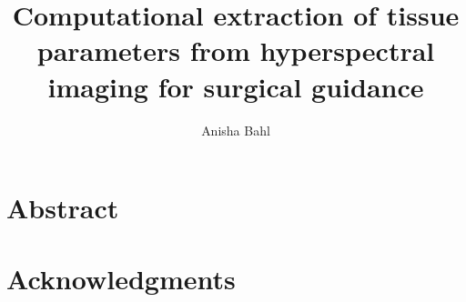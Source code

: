 \documentclass[british,a4paper,11pt,twoside]{StyleThese}
\title{Computational extraction of tissue parameters from hyperspectral imaging for surgical guidance}\let\thetitle\@title
\author{Anisha Bahl}\let\theauthor\@author
\begin{document}
\frontmatter


%

\dominitoc

\copyrightpage{\the\year}{\theauthor}
\declarationpage{\theauthor}

\cleardoublepage
\chapter{Abstract}



\cleardoublepage
\chapter{Acknowledgments}


\cleardoublepage
\tableofcontents

\clearpage
\listoftables
\clearpage
\listoffigures

\mainmatter











% 

\backmatter



 
\end{document}
